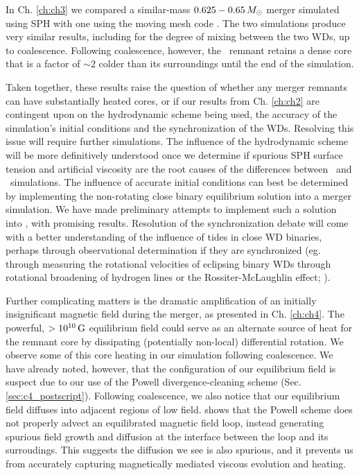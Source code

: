 In Ch. \ref{ch:ch3} we compared a similar-mass $0.625-0.65\,\Msun$ merger simulated using SPH with one using the moving mesh code \arepo.  The two simulations produce very similar results, including for the degree of mixing between the two WDs, up to coalescence.  Following coalescence, however, the \arepo\ remnant retains a dense core that is a factor of $\sim2$ colder than its surroundings until the end of the simulation.


Taken together, these results raise the question of whether any merger remnants can have substantially heated cores, or if our results from Ch. \ref{ch:ch2} are contingent upon on the hydrodynamic scheme being used, the accuracy of the simulation's initial conditions and the synchronization of the WDs.  Resolving this issue will require further simulations.  The influence of the hydrodynamic scheme will be more definitively understood once we determine if spurious SPH surface tension and artificial viscosity are the root causes of the differences between \gasoline\ and \arepo\ simulations.  The influence of accurate initial conditions can best be determined by implementing the non-rotating close binary equilibrium solution \citep{uryue98} into a merger simulation.  We have made preliminary attempts to implement such a solution into \gasoline, with promising results.  Resolution of the synchronization debate will come with a better understanding of the influence of tides in close WD binaries, perhaps through observational determination if they are synchronized (eg. through measuring the rotational velocities of eclipsing binary WDs through rotational broadening of hydrogen lines or the Rossiter-McLaughlin effect; \citealt{piro11}).

Further complicating matters is the dramatic amplification of an initially insignificant magnetic field during the merger, as presented in Ch. \ref{ch:ch4}.  The powerful, $>10^{10}\,\mathrm{G}$ equilibrium field could serve as an alternate source of heat for the remnant core by dissipating (potentially non-local) differential rotation.  We observe some of this core heating in our simulation following coalescence.  We have already noted, however, that the configuration of our equilibrium field is suspect due to our use of the Powell divergence-cleaning scheme (Sec. \ref{sec:c4_postscript}).  Following coalescence, we also notice that our equilibrium field diffuses into adjacent regions of low field.  \cite{hopkr16} shows that the Powell scheme does not properly advect an equilibrated magnetic field loop, instead generating spurious field growth and diffusion at the interface between the loop and its surroudings.  This suggests the diffusion we see is also spurious, and it prevents us from accurately capturing magnetically mediated viscous evolution and heating.

